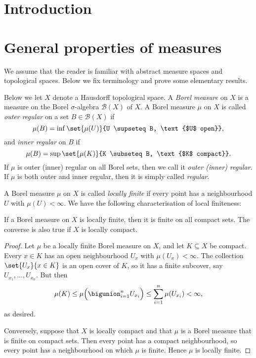 \documentclass[article, a4paper, 11pt, oneside]{memoir}
\title{\doctitle}
\author{\docauthor}
\numberwithin{equation}{chapter}
\newcommand{\calB}{\mathcal{B}}
\newcommand{\borel}[1]{\calB(#1)}
\begin{document}
\maketitle

\chapter{Introduction}


\chapter{General properties of measures}

We assume that the reader is familiar with abstract measure spaces and topological spaces. Below we fix terminology and prove some elementary results.

Below we let $X$ denote a Hausdorff topological space. A \emph{Borel measure} on $X$ is a measure on the Borel $\sigma$-algebra $\borel{X}$ of $X$. A Borel measure $\mu$ on $X$ is called \emph{outer regular} on a set $B \in \borel{X}$ if
%
\begin{equation*}
    \mu(B)
        = \inf \set{\mu(U)}{U \supseteq B, \text{$U$ open}},
\end{equation*}
%
and \emph{inner regular} on $B$ if
%
\begin{equation*}
    \mu(B)
        = \sup \set{\mu(K)}{K \subseteq B, \text{$K$ compact}}.
\end{equation*}
%
If $\mu$ is outer (inner) regular on all Borel sets, then we call it \emph{outer (inner) regular}. If $\mu$ is both outer and inner regular, then it is simply called \emph{regular}.

A Borel measure $\mu$ on $X$ is called \emph{locally finite} if every point has a neighbourhood $U$ with $\mu(U) < \infty$. We have the following characterisation of local finiteness:

\begin{proposition}
    If a Borel measure on $X$ is locally finite, then it is finite on all compact sets. The converse is also true if $X$ is locally compact.
\end{proposition}

\begin{proof}
    Let $\mu$ be a locally finite Borel measure on $X$, and let $K \subseteq X$ be compact. Every $x \in K$ has an open neighbourhood $U_x$ with $\mu(U_x) < \infty$. The collection $\set{U_x}{x \in K}$ is an open cover of $K$, so it has a finite subcover, say $U_{x_1}, \ldots, U_{x_n}$. But then
    \begin{equation*}
        \mu(K)
            \leq \mu \Bigl( \bigunion_{i=1}^n U_{x_i} \Bigr)
            \leq \sum_{i=1}^n \mu(U_{x_i})
            < \infty,
    \end{equation*}
    as desired.

    Conversely, suppose that $X$ is locally compact and that $\mu$ is a Borel measure that is finite on compact sets. Then every point has a compact neighbourhood, so every point has a neighbourhood on which $\mu$ is finite. Hence $\mu$ is locally finite.
\end{proof}
\end{document}
